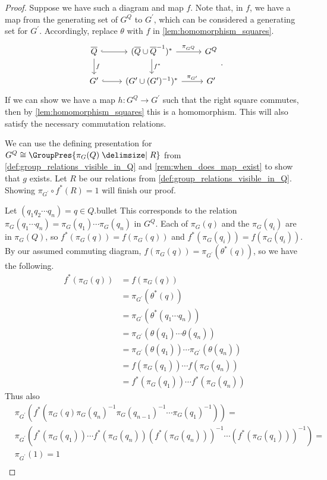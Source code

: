 \begin{proof}
	Suppose we have such a diagram and map $f$.
Note that, in $f$, we have a map from the generating set of $G^Q$ to $G^\prime$, which can be considered a generating set for $G^\prime$.
Accordingly, replace $\theta$ with  $f$ in \cref{lem:homomorphism_squares}.
	\[
		\begin{tikzcd}
			\overline{Q} \ar[d, "f"] \ar[r, hook] & (\overline{Q} \cup \overline{Q}^{-1})^* \ar[d, "f^*"] \ar[r, "\pi_{G^Q}"] & G^Q \\
			G^\prime \ar[r, hook] & (G^\prime \cup (G^\prime)^{-1})^* \ar[r, "\pi_{G^\prime}"] & G^\prime
		\end{tikzcd}
		.\]
	If we can show we have a map $h \colon G^Q \to G^\prime$ such that the right square commutes, then by \cref{lem:homomorphism_squares} this is a homomorphism.
This will also satisfy the necessary commutation relations.

	We can use the defining presentation for $G^Q \cong \GroupPres{\pi_G(Q) \relations R}$ from \cref{def:group_relations_visible_in_Q} and \cref{rem:when_does_map_exist} to show that $g$ exists.
Let $R$ be our relations from \cref{def:group_relations_visible_in_Q}.
Showing $\pi_{G^\prime} \circ f^*\left( R \right) = 1 $ will finish our proof.

	Let $(q_1q_2\cdots q_n) = q \in Q$.bullet
	This corresponds to the relation $\pi_G(q_1\cdots q_n) = \pi_G(q_1)\cdots \pi_G(q_n) $ in $G^Q$.
	Each of $\pi_G(q)$ and the  $\pi_G(q_i)$ are in  $\pi_G(Q)$, so  $f^*(\pi_G(q)) = f(\pi_G(q))$ and  $f^*(\pi_G(q_i)) = f(\pi_G(q_i))$.
	By our assumed commuting diagram,  $f(\pi_G(q)) = \pi_{G^\prime}(\theta^*(q))$, so we have the following.
	\begin{align*}
		f^*(\pi_G(q)) & = f(\pi_G(q))                                                    \\
		                 & = \pi_{G^\prime}(\theta^*(q))                                 \\
		                 & = \pi_{G^\prime}(\theta^*(q_1\cdots q_n))                     \\
		                 & = \pi_{G^\prime}(\theta(q_1) \cdots \theta(q_n))                 \\
		                 & = \pi_{G^\prime}(\theta(q_1)) \cdots \pi_{G^\prime}(\theta(q_n)) \\
		                 & = f(\pi_G(q_1)) \cdots f(\pi_G(q_n))                             \\
		                 & = f^*(\pi_G(q_1)) \cdots f^*(\pi_G(q_n))
	\end{align*}
	Thus also
	\begin{align*}
		 & \pi_{G^\prime}(f^*(\pi_G(q)\pi_G(q_n)^{-1}\pi_G(q_{n-1})^{-1} \cdots \pi_G(q_1)^{-1})) =                            \\
		 & \pi_{G^\prime}(f^*(\pi_G(q_1))\cdots f^*(\pi_G(q_n))(f^*(\pi_G(q_n)))^{-1}\cdots (f^*(\pi_G(q_1)))^{-1}) = \\
		 & \pi_{G^\prime}(1)  = 1                                                                                                 \\
	\end{align*}
\end{proof}


